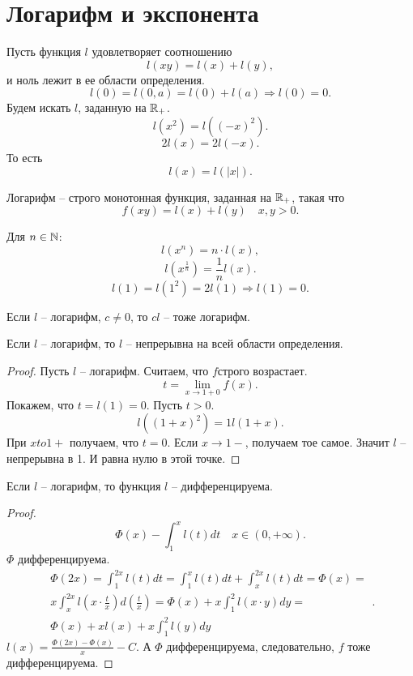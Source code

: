 \documentclass[11pt]{book}
\begin{document}
\section{Логарифм и экспонента}
Пусть функция $ l$ удовлетворяет соотношению
\[
    l(xy) = l(x)+l(y)
,\]
и ноль лежит в ее области определения.
\[
    l(0) = l(0, a) = l(0) + l(a) \Longrightarrow l(0) = 0
.\]
Будем искать $ l$, заданную на $ \mathbb{R}_{+}$.
\[
    l(x^2) = l((-x)^2)
.\]
\[
    2l(x) = 2 l(-x)
.\]
То есть \[
    l(x) = l(|x|)
.\]
\begin{defn}
    Логарифм -- строго монотонная функция, заданная на $ \mathbb{R}_{+}$, такая что \[
	f(xy) = l(x) + l(y) \quad x, y >0
    .\]
\end{defn}
\begin{st}
    Для $ n \in  \mathbb{N}$:
    \[
	l(x^{n}) = n\cdot l(x)
    ,\]
    \[
	l(x^{\frac{1}{n}}) = \frac{1}{n} l(x)
    .\]
    \[
	l(1) = l(1^2) = 2 l(1) \Longrightarrow l(1) = 0
    .\]
\end{st}
\begin{st}
    Если $ l$ -- логарифм, $ c\ne 0$, то $ cl$ -- тоже логарифм.
\end{st}
\begin{lm}
    Если $ l$ -- логарифм, то $ l$ -- непрерывна на всей области определения.
\end{lm}
\begin{proof}
    Пусть $ l$ -- логарифм. Считаем, что $ f$строго возрастает.
    \[
	t = \lim_{x \to 1 + 0} f(x)
    .\]
    Покажем, что $ t = l(1) = 0$.
    Пусть  $ t>0$. \[
	l((1+ x)^{2}) = 1 l(1+ x)
    .\]
    При $ x to 1+$ получаем, что $ t=0$.
    Если  $ x \to  1-$, получаем тое самое. Значит $l$ -- непрерывна в 1.
    И равна нулю в этой точке.
\end{proof}
\begin{lm}
    Если $ l$ -- логарифм, то функция $ l$ -- дифференцируема.
\end{lm}
\begin{proof}
    \[
	\Phi (x) - \int_1^{x}l(t) dt \quad x \in  (0, + \infty)
    .\]
    $ \Phi$  дифференцируема.
    \[
	\begin{array}{cc}
	    \Phi(2x) = \int_1^{2x} l(t) dt = \int_1^{x}  l(t) dt + \int_x^{2x}l(t) dt = \Phi(x) = \\
	    x \int_x^{2x} l(x \cdot \frac{t}{x}) d(\frac{t}{x}) = \Phi (x) + x \int_1 ^{2} l(x \cdot y) dy = \\
	    \Phi(x) + x l(x) + x \int_1^{2} l(y) dy
	\end{array}
    .\]
    $ l(x) = \frac{\Phi(2x) -\Phi(x) }{x} - C$.
    А $ \Phi$  дифференцируема, следовательно, $ f$  тоже дифференцируема.
\end{proof}
\end{document}
